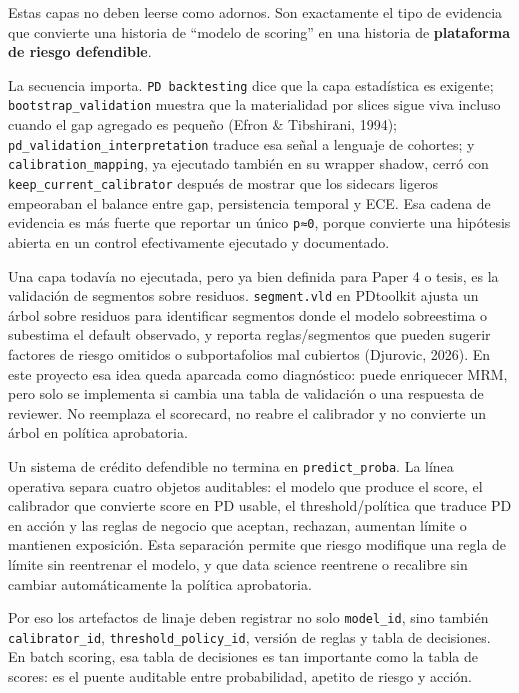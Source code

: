 \documentclass[
  spanish,
  11pt,
  letterpaper,
]{scrbook}
\theoremstyle{plain}
\theoremstyle{remark}
\begin{document}
Estas capas no deben leerse como adornos. Son exactamente el tipo de
evidencia que convierte una historia de ``modelo de scoring'' en una
historia de \textbf{plataforma de riesgo defendible}.

La secuencia importa. \texttt{PD\ backtesting} dice que la capa
estadística es exigente; \texttt{bootstrap\_validation} muestra que la
materialidad por slices sigue viva incluso cuando el gap agregado es
pequeño (Efron \& Tibshirani, 1994);
\texttt{pd\_validation\_interpretation} traduce esa señal a lenguaje de
cohortes; y \texttt{calibration\_mapping}, ya ejecutado también en su
wrapper shadow, cerró con \texttt{keep\_current\_calibrator} después de
mostrar que los sidecars ligeros empeoraban el balance entre gap,
persistencia temporal y ECE. Esa cadena de evidencia es más fuerte que
reportar un único \texttt{p≈0}, porque convierte una hipótesis abierta
en un control efectivamente ejecutado y documentado.

Una capa todavía no ejecutada, pero ya bien definida para Paper 4 o
tesis, es la validación de segmentos sobre residuos.
\texttt{segment.vld} en PDtoolkit ajusta un árbol sobre residuos para
identificar segmentos donde el modelo sobreestima o subestima el default
observado, y reporta reglas/segmentos que pueden sugerir factores de
riesgo omitidos o subportafolios mal cubiertos (Djurovic, 2026). En este
proyecto esa idea queda aparcada como diagnóstico: puede enriquecer MRM,
pero solo se implementa si cambia una tabla de validación o una
respuesta de reviewer. No reemplaza el scorecard, no reabre el
calibrador y no convierte un árbol en política aprobatoria.

\begin{tcolorbox}[enhanced jigsaw, arc=.35mm, bottomrule=.15mm, bottomtitle=1mm, breakable, colback=white, colbacktitle=quarto-callout-note-color!10!white, colframe=quarto-callout-note-color-frame, coltitle=black, left=2mm, leftrule=.75mm, opacityback=0, opacitybacktitle=0.6, rightrule=.15mm, title=\textcolor{quarto-callout-note-color}{\faInfo}\hspace{0.5em}{Separar scoring, calibración y reglas de negocio}, titlerule=0mm, toprule=.15mm, toptitle=1mm]

Un sistema de crédito defendible no termina en \texttt{predict\_proba}.
La línea operativa separa cuatro objetos auditables: el modelo que
produce el score, el calibrador que convierte score en PD usable, el
threshold/política que traduce PD en acción y las reglas de negocio que
aceptan, rechazan, aumentan límite o mantienen exposición. Esta
separación permite que riesgo modifique una regla de límite sin
reentrenar el modelo, y que data science reentrene o recalibre sin
cambiar automáticamente la política aprobatoria.

Por eso los artefactos de linaje deben registrar no solo
\texttt{model\_id}, sino también \texttt{calibrator\_id},
\texttt{threshold\_policy\_id}, versión de reglas y tabla de decisiones.
En batch scoring, esa tabla de decisiones es tan importante como la
tabla de scores: es el puente auditable entre probabilidad, apetito de
riesgo y acción.

\end{tcolorbox}
\end{document}
